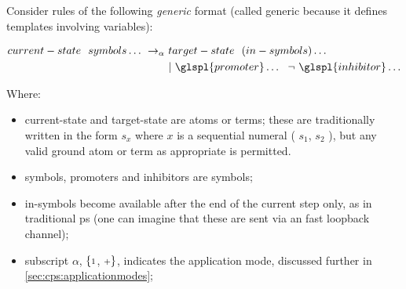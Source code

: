 Consider rules of the following \emph{generic} format 
(called generic because it defines templates involving variables):
\begin{framed}
\vspace{-0.6cm}
\begin{align*}
 current-state  ~~  symbols  \dots ~ \rightarrow_\alpha ~ &  target-state  ~~ ( in-symbols ) \dots ~~ \\
 & | ~  \glspl{promoter} \dots ~~ \neg ~  \glspl{inhibitor} \dots
\end{align*}
\vspace{-0.8cm}
\end{framed}
Where:
\begin{itemize}
\item  current-state  and  target-state  are atoms or terms;  these are traditionally written in the form \(s_x\) where \(x\) is a sequential numeral (\eg{} \(s_1\), \(s_2\) \etc{}), but any valid ground atom or term as appropriate is permitted.

\smallskip
\item  symbols, \glspl{promoter} and \glspl{inhibitor} are symbols;

\smallskip
\item  in-symbols  become available after the end of the current step only, as in traditional \gls{ps}  (one can imagine that these are sent via an \adhoc{} fast  loopback  channel); 

\smallskip
\item subscript \(\alpha\), \(\{{\scriptstyle 1}\), \({\scriptstyle +}\}\), 
indicates the application mode, discussed further in \cref{sec:cps:applicationmodes};





\end{itemize}

